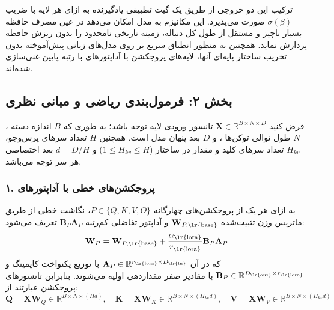 ترکیب این دو خروجی از طریق یک گیت تطبیقی یادگیرنده به ازای هر لایه با ضریب $\sigma(\beta)$ صورت می‌پذیرد. این مکانیزم به مدل امکان می‌دهد در عین مصرف حافظه بسیار ناچیز و مستقل از طول کل دنباله، زمینه تاریخی نامحدود را بدون ریزش حافظه پردازش نماید. همچنین به منظور انطباق سریع بر روی مدل‌های زبانی پیش‌آموخته بدون تخریب ساختار پایه‌ای آنها، لایه‌های پروجکشن با آداپتورهای با رتبه پایین  غنی‌سازی شده‌اند.

\subsection*{بخش ۲: فرمول‌بندی ریاضی و مبانی نظری }
فرض کنید $\mathbf{X} \in \mathbb{R}^{B \times N \times D}$ تانسور ورودی لایه توجه باشد؛ به طوری که $B$ اندازه دسته ، $N$ طول توالی توکن‌ها ، و $D$ بعد پنهان مدل  است. همچنین $H$ تعداد سرهای پرس‌وجو، $H_{kv}$ تعداد سرهای کلید و مقدار در ساختار  ($1 \le H_{kv} \le H$) و $d = D / H$ بعد اختصاصی هر سر توجه می‌باشد.

\subsubsection*{۱. پروجکشن‌های خطی با آداپتورهای }
به ازای هر یک از پروجکشن‌های چهارگانه $P \in \{Q, K, V, O\}$، نگاشت خطی از طریق ماتریس وزن تثبیت‌شده $\mathbf{W}_{P, \text{\lr{base}}}$ و آداپتور تفاضلی کم‌رتبه $\mathbf{B}_P \mathbf{A}_P$ تعریف می‌شود:
\begin{equation}
\mathbf{W}_P = \mathbf{W}_{P, \text{\lr{base}}} + \frac{\alpha_{\text{\lr{lora}}}}{r_{\text{\lr{lora}}}} \mathbf{B}_P \mathbf{A}_P
\end{equation}
که در آن $\mathbf{A}_P \in \mathbb{R}^{r_{\text{\lr{lora}}} \times D_{\text{\lr{in}}}}$ با توزیع یکنواخت کایمینگ  و $\mathbf{B}_P \in \mathbb{R}^{D_{\text{\lr{out}}} \times r_{\text{\lr{lora}}}}$ با مقادیر صفر مقداردهی اولیه می‌شوند. بنابراین تانسورهای پروجکشن عبارتند از:
\begin{equation}
\mathbf{Q} = \mathbf{X} \mathbf{W}_Q \in \mathbb{R}^{B \times N \times (H d)}, \quad
\mathbf{K} = \mathbf{X} \mathbf{W}_K \in \mathbb{R}^{B \times N \times (H_{kv} d)}, \quad
\mathbf{V} = \mathbf{X} \mathbf{W}_V \in \mathbb{R}^{B \times N \times (H_{kv} d)}
\end{equation}

